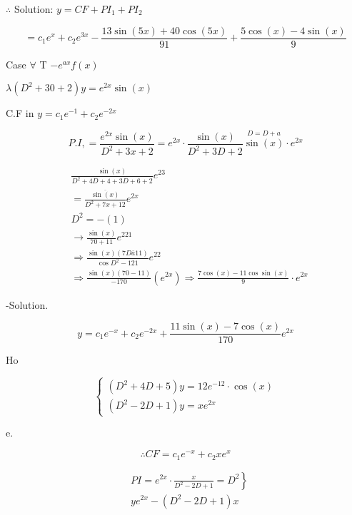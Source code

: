 \documentclass[12pt, a4paper]{article}
\begin{document}
	$\therefore$ Solution: $y=C F+P I_{1}+P I_{2}$

$$
=c_{1} e^{x}+c_{2} e^{3 x}-\frac{13 \sin(5 x)+40 \cos(5 x)}{91}+\frac{5 \cos(x)-4 \sin(x)}{9}
$$

	Case $\forall$ T $-e^{a x} f(x)$

	$\lambda\left(D^{2}+30+2\right) y=e^{2 x} \sin(x)$

	C.F in $y=c_{1} e^{-1}+c_{2} e^{-2 x}$

$$
P . I,=\frac{e^{2 x} \sin(x)}{D^{2}+3 x+2}=e^{2 x} \cdot \frac{\sin(x)}{D^{2}+3 D+2} \stackrel{D=D+a}{\sin(x)} \cdot e^{2 x}
$$

$$
\begin{aligned}
	 & \frac{\sin(x)}{D^{2}+4 D+4+3 D+6+2} e^{23}                                                                                \\
	 & =\frac{\overline{\sin(x)}}{D^{2}+7 x+12} e^{2 x}                                                                          \\
	 & D^{2}=-(1)                                                                                                                \\
	 & \rightarrow \frac{\sin(x)}{70+11} e^{221}                                                                                 \\
	 & \Rightarrow \frac{\sin(x)(7 D \bar{a} 11)}{\cos D^{2}-121} e^{22}                                                         \\
	 & \Rightarrow \frac{\sin(x)(70-11)}{-170}\left(e^{2 x}\right) \Rightarrow \frac{7 \cos(x)-11 \cos \sin(x)}{9} \cdot e^{2 x}
\end{aligned}
$$

	-Solution.

$$
y=c_{1} e^{-x}+c_{2} e^{-2 x}+\frac{11 \sin(x)-7 \cos(x)}{170} e^{2 x}
$$

	Ho

$$
\left\{\begin{array}{l}
	\left(D^{2}+4 D+5\right) y=12 e^{-12} \cdot \cos(x) \\
	\left(D^{2}-2 D+1\right) y=x e^{2 x}
\end{array}\right.
$$

	e.

$$
\therefore C F=c_{1} e^{-x}+c_{2} x e^{x}
$$

$$
\begin{aligned}
	 & \left.P I=e^{2 x} \cdot \frac{x}{D^{2}-2 D+1}=D^{2}\right\} \\
	 & y e^{2 x}-\left(D^{2}-2 D+1\right) x
\end{aligned}
$$
\end{document}
